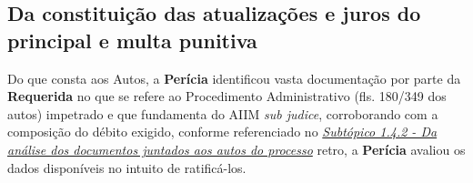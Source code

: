 \subsection{Da constituição das atualizações e juros do principal e multa punitiva}

Do que consta aos Autos, a \textbf{Perícia} identificou vasta documentação por parte da \textbf{Requerida} no que se refere ao Procedimento Administrativo (fls. 180/349 dos autos) impetrado e que fundamenta do AIIM \textit{sub judice}, corroborando com a composição do débito exigido, conforme referenciado no \hyperlink{1.4.2}{\emph{Subtópico 1.4.2 - Da análise dos documentos juntados aos autos do processo}} retro, a \textbf{Perícia} avaliou os dados disponíveis no intuito de ratificá-los.
